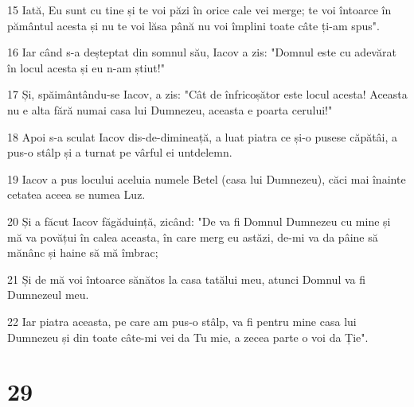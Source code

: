 \par 15 Iată, Eu sunt cu tine și te voi păzi în orice cale vei merge; te voi întoarce în pământul acesta și nu te voi lăsa până nu voi împlini toate câte ți-am spus".
\par 16 Iar când s-a deșteptat din somnul său, Iacov a zis: "Domnul este cu adevărat în locul acesta și eu n-am știut!"
\par 17 Și, spăimântându-se Iacov, a zis: "Cât de înfricoșător este locul acesta! Aceasta nu e alta fără numai casa lui Dumnezeu, aceasta e poarta cerului!"
\par 18 Apoi s-a sculat Iacov dis-de-dimineață, a luat piatra ce și-o pusese căpătâi, a pus-o stâlp și a turnat pe vârful ei untdelemn.
\par 19 Iacov a pus locului aceluia numele Betel (casa lui Dumnezeu), căci mai înainte cetatea aceea se numea Luz.
\par 20 Și a făcut Iacov făgăduință, zicând: "De va fi Domnul Dumnezeu cu mine și mă va povățui în calea aceasta, în care merg eu astăzi, de-mi va da pâine să mănânc și haine să mă îmbrac;
\par 21 Și de mă voi întoarce sănătos la casa tatălui meu, atunci Domnul va fi Dumnezeul meu.
\par 22 Iar piatra aceasta, pe care am pus-o stâlp, va fi pentru mine casa lui Dumnezeu și din toate câte-mi vei da Tu mie, a zecea parte o voi da Ție".

\chapter{29}


